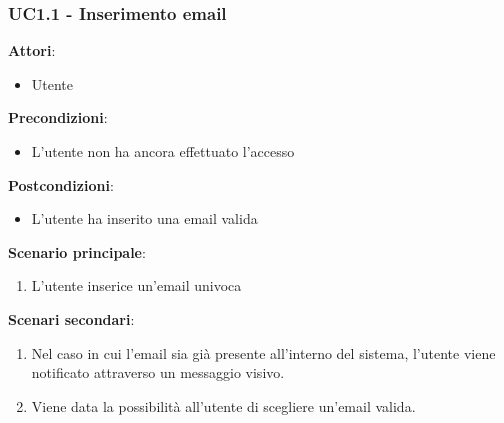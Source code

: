 \subsubsection{UC1.1 - Inserimento email}\label{usecase:1_1}
\textbf{Attori}:
\begin{itemize}
    \item Utente
\end{itemize}
\textbf{Precondizioni}:
\begin{itemize}
    \item L'utente non ha ancora effettuato l'accesso
\end{itemize}
\textbf{Postcondizioni}:
\begin{itemize}
    \item L'utente ha inserito una email valida
\end{itemize}
\textbf{Scenario principale}:
\begin{enumerate}
    \item L'utente inserice un'email univoca
\end{enumerate}
\textbf{Scenari secondari}:
\begin{enumerate}
    \item Nel caso in cui l'email sia già presente all'interno del sistema, l'utente viene notificato attraverso un messaggio visivo.
    \item Viene data la possibilità all'utente di scegliere un'email valida.
\end{enumerate}

